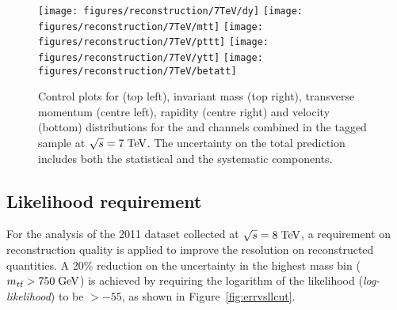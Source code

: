 \begin{figure}[!htb]\centering
  \texttt{[image: figures/reconstruction/7TeV/dy]}
  \texttt{[image: figures/reconstruction/7TeV/mtt]}
  \texttt{[image: figures/reconstruction/7TeV/pttt]}
  \texttt{[image: figures/reconstruction/7TeV/ytt]}
  \texttt{[image: figures/reconstruction/7TeV/betatt]}
  \caption[Control plots for reconstructed quantities at $\sqrt{s} = 7
  \TeV{}$]{Control plots for \dy{} (top left), invariant mass \mtt{} 
    (top right), transverse momentum \pttt{} (centre left), rapidity
    \ytt{} (centre right) and velocity \betatt{} (bottom)
    distributions for the \ejets{} and \mujets{} channels combined in the
    tagged sample at $\sqrt{s} = 7 \TeV{}$. The uncertainty on the
    total prediction includes both the statistical and the systematic
    components.} 
  \label{fig:datamcreco2011}
\end{figure}


\subsection{Likelihood requirement}
\label{sec:Reconstruction:lhood}

For the analysis of the 2011 dataset collected at $\sqrt{s} = 8
\; \mathrm{TeV}{}$, a requirement on reconstruction quality is applied to improve
the resolution on reconstructed quantities.
A 20\% reduction on the \ac{} uncertainty in the highest mass bin ($m_{t\bar{t}}{}>750\; \mathrm{GeV}{}$)
is achieved by requiring the logarithm of the likelihood ({\it log-likelihood}) to be $>-55$,
as shown in Figure~\ref{fig:errvsllcut}.

